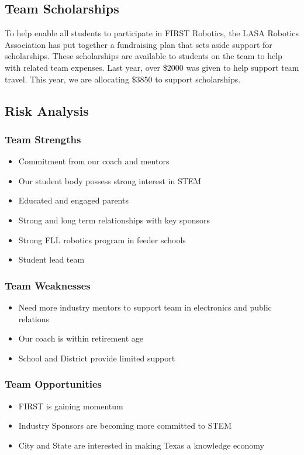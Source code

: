 \subsection{Team Scholarships}
To help enable all students to participate in FIRST Robotics, the LASA Robotics Association has put together a fundraising plan that sets aside support for scholarships. These scholarships are available to students on the team to help with related team expenses. Last year, over \$2000 was given to help support team travel. This year, we are allocating \$3850 to support scholarships.

\subsection{Risk Analysis}
\subsubsection{Team Strengths}
\begin{itemize}
	\item Commitment from our coach and mentors
	\item Our student body possess strong interest in STEM
	\item Educated and engaged parents
	\item Strong and long term relationships with key sponsors
	\item Strong FLL robotics program in feeder schools
	\item Student lead team
\end{itemize}

\subsubsection{Team Weaknesses}
\begin{itemize}
	\item Need more industry mentors to support team in electronics and public relations
	\item Our coach is within retirement age
	\item School and District provide limited support
\end{itemize}

\subsubsection{Team Opportunities}
\begin{itemize}
	\item FIRST is gaining momentum
	\item Industry Sponsors are becoming more committed to STEM
	\item City and State are interested in making Texas a knowledge economy
\end{itemize}

